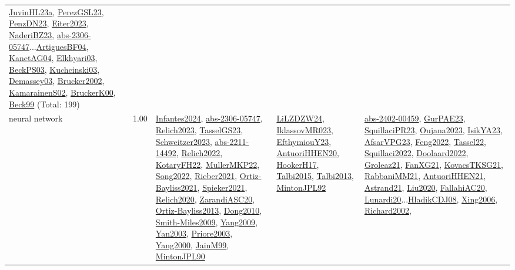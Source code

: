 {\begin{longtable}{p{3cm}r>{\raggedright\arraybackslash}p{6cm}>{\raggedright\arraybackslash}p{6cm}>{\raggedright\arraybackslash}p{8cm}}
\hyperref[detail:JuvinHL23a]{JuvinHL23a}, \hyperref[detail:PerezGSL23]{PerezGSL23}, \hyperref[detail:PenzDN23]{PenzDN23}, \hyperref[detail:Eiter2023]{Eiter2023}, \hyperref[detail:NaderiBZ23]{NaderiBZ23}, \hyperref[detail:abs-2306-05747]{abs-2306-05747}...\hyperref[detail:ArtiguesBF04]{ArtiguesBF04}, \hyperref[detail:KanetAG04]{KanetAG04}, \hyperref[detail:Elkhyari03]{Elkhyari03}, \hyperref[detail:BeckPS03]{BeckPS03}, \hyperref[detail:Kuchcinski03]{Kuchcinski03}, \hyperref[detail:Demassey03]{Demassey03}, \hyperref[detail:Brucker2002]{Brucker2002}, \hyperref[detail:KamarainenS02]{KamarainenS02}, \hyperref[detail:BruckerK00]{BruckerK00}, \hyperref[detail:Beck99]{Beck99} (Total: 199)\\
\index{neural network}\index{Algorithms!neural network}neural network &  1.00 & \hyperref[detail:Infantes2024]{Infantes2024}, \hyperref[detail:abs-2306-05747]{abs-2306-05747}, \hyperref[detail:Relich2023]{Relich2023}, \hyperref[detail:TasselGS23]{TasselGS23}, \hyperref[detail:Schweitzer2023]{Schweitzer2023}, \hyperref[detail:abs-2211-14492]{abs-2211-14492}, \hyperref[detail:Relich2022]{Relich2022}, \hyperref[detail:KotaryFH22]{KotaryFH22}, \hyperref[detail:MullerMKP22]{MullerMKP22}, \hyperref[detail:Song2022]{Song2022}, \hyperref[detail:Rieber2021]{Rieber2021}, \hyperref[detail:Ortiz-Bayliss2021]{Ortiz-Bayliss2021}, \hyperref[detail:Spieker2021]{Spieker2021}, \hyperref[detail:Relich2020]{Relich2020}, \hyperref[detail:ZarandiASC20]{ZarandiASC20}, \hyperref[detail:Ortiz-Bayliss2013]{Ortiz-Bayliss2013}, \hyperref[detail:Dong2010]{Dong2010}, \hyperref[detail:Smith-Miles2009]{Smith-Miles2009}, \hyperref[detail:Yang2009]{Yang2009}, \hyperref[detail:Yan2003]{Yan2003}, \hyperref[detail:Priore2003]{Priore2003}, \hyperref[detail:Yang2000]{Yang2000}, \hyperref[detail:JainM99]{JainM99}, \hyperref[detail:MintonJPL90]{MintonJPL90} & \hyperref[detail:LiLZDZW24]{LiLZDZW24}, \hyperref[detail:IklassovMR023]{IklassovMR023}, \hyperref[detail:EfthymiouY23]{EfthymiouY23}, \hyperref[detail:AntuoriHHEN20]{AntuoriHHEN20}, \hyperref[detail:HookerH17]{HookerH17}, \hyperref[detail:Talbi2015]{Talbi2015}, \hyperref[detail:Talbi2013]{Talbi2013}, \hyperref[detail:MintonJPL92]{MintonJPL92} & \hyperref[detail:abs-2402-00459]{abs-2402-00459}, \hyperref[detail:GurPAE23]{GurPAE23}, \hyperref[detail:SquillaciPR23]{SquillaciPR23}, \hyperref[detail:Oujana2023]{Oujana2023}, \hyperref[detail:IsikYA23]{IsikYA23}, \hyperref[detail:AfsarVPG23]{AfsarVPG23}, \hyperref[detail:Feng2022]{Feng2022}, \hyperref[detail:Tassel22]{Tassel22}, \hyperref[detail:Squillaci2022]{Squillaci2022}, \hyperref[detail:Doolaard2022]{Doolaard2022}, \hyperref[detail:Groleaz21]{Groleaz21}, \hyperref[detail:FanXG21]{FanXG21}, \hyperref[detail:KovacsTKSG21]{KovacsTKSG21}, \hyperref[detail:RabbaniMM21]{RabbaniMM21}, \hyperref[detail:AntuoriHHEN21]{AntuoriHHEN21}, \hyperref[detail:Astrand21]{Astrand21}, \hyperref[detail:Liu2020]{Liu2020}, \hyperref[detail:FallahiAC20]{FallahiAC20}, \hyperref[detail:Lunardi20]{Lunardi20}...\hyperref[detail:HladikCDJ08]{HladikCDJ08}, \hyperref[detail:Xing2006]{Xing2006}, \hyperref[detail:Richard2002]{Richard2002}, 
\end{longtable}}
